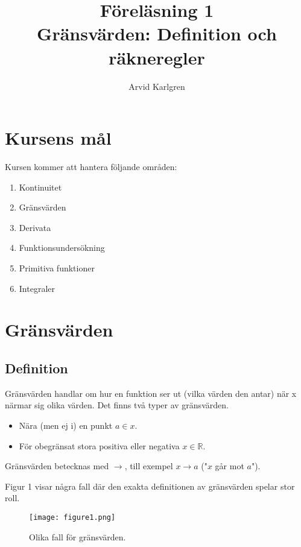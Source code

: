 \documentclass[swedish]{article}
\author{Arvid Karlgren}
\title{Föreläsning 1\\
       \LARGE Gränsvärden: Definition och räkneregler}
\begin{document}
\maketitle

\tableofcontents

\pagebreak

\section{Kursens mål}

Kursen kommer att hantera följande områden:

\begin{enumerate}
    \item Kontinuitet
    \item Gränsvärden
    \item Derivata
    \item Funktionsundersökning
    \item Primitiva funktioner
    \item Integraler
\end{enumerate}

\section{Gränsvärden}

\subsection{Definition}

Gränsvärden handlar om hur en funktion ser ut (vilka värden den antar) när x närmar sig olika värden. Det finns två typer av gränsvärden.

\begin{itemize}
    \item{Nära (men ej i) en punkt $a\in x$.}
    \item{För obegränsat stora positiva eller negativa $x\in \mathbb{R}$.}
\end{itemize}

Gränsvärden betecknas med $\to$, till exempel $x \to a$ ("$x$ går mot $a$").

Figur 1 visar några fall där den exakta definitionen av gränsvärden spelar stor roll. 

\begin{figure}[h!]
    \texttt{[image: figure1.png]}
    \label{fig:figure1}
    \caption{Olika fall för gränsvärden.}
\end{figure}
\end{document}
